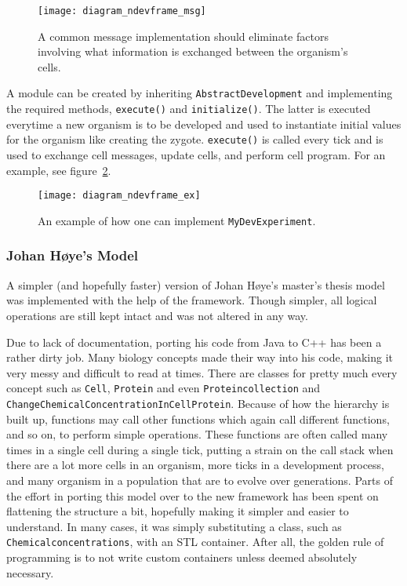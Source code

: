 \begin{figure}[ht]
	\centering
	\texttt{[image: diagram\_ndevframe\_msg]}
	\caption{A common message implementation should eliminate factors involving what information is exchanged between the organism's cells.}
	\label{fig:diagram_ndevframe_msg}
\end{figure}

A module can be created by inheriting \texttt{AbstractDevelopment} and implementing the required methods, \texttt{execute()} and \texttt{initialize()}. The latter is executed everytime a new organism is to be developed and used to instantiate initial values for the organism like creating the zygote. \texttt{execute()} is called every tick and is used to exchange cell messages, update cells, and perform cell program. For an example, see figure~\ref{fig:diagram_ndevframe_ex}.

\begin{figure}[ht]
	\centering
	\texttt{[image: diagram\_ndevframe\_ex]}
	\caption{An example of how one can implement \texttt{MyDevExperiment}.}
	\label{fig:diagram_ndevframe_ex}
\end{figure}


\subsubsection{Johan H{\o}ye's Model}
A simpler (and hopefully faster) version of Johan H{\o}ye's master's thesis\cite{hoye2006} model was implemented with the help of the framework. Though simpler, all logical operations are still kept intact and was not altered in any way.

Due to lack of documentation, porting his code from Java to C++ has been a rather dirty job. Many biology concepts made their way into his code, making it very messy and difficult to read at times. There are classes for pretty much every concept such as \texttt{Cell}, \texttt{Protein} and even \texttt{Proteincollection} and \texttt{ChangeChemicalConcentrationInCellProtein}. Because of how the hierarchy is built up, functions may call other functions which again call different functions, and so on, to perform simple operations. These functions are often called many times in a single cell during a single tick, putting a strain on the call stack when there are a lot more cells in an organism, more ticks in a development process, and many organism in a population that are to evolve over generations. Parts of the effort in porting this model over to the new framework has been spent on flattening the structure a bit, hopefully making it simpler and easier to understand. In many cases, it was simply substituting a class, such as \texttt{Chemicalconcentrations}, with an STL container. After all, the golden rule of programming is to not write custom containers unless deemed absolutely necessary.

